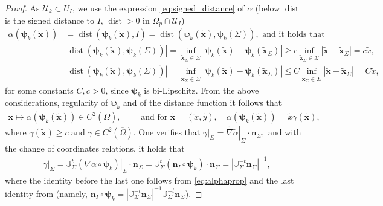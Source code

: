 \documentclass[report]{elsarticle}
\newtheorem{lemma}[theorem]{Lemma}
\numberwithin{theorem}{section}
\newcommand{\tbx}{\widetilde{\mathbf{x}}}
\newcommand{\bpsi}{\boldsymbol{\psi}}
\renewcommand{\vec}[1]{\mathbf{#1}}
\begin{document}
\begin{proof}
As $\mathcal{U}_k\subset U_I$, we use the expression  \eqref{eq:signed_distance} of $\alpha$ (below $\operatorname{dist}$ is the signed distance to $I$, $\operatorname{dist}>0$ in $\Omega_p\cap \mathcal{U}_I$)
	\begin{align*}
		\alpha(\bpsi_k(\tbx))&=\operatorname{dist}(\bpsi_k(\tbx), I)=\operatorname{dist}(\bpsi_k(\tbx), \bpsi_k(\Sigma)), \text{ and it holds that }\\	
		&|\operatorname{dist}(\bpsi_k(\tbx), \bpsi_k(\Sigma))|=\inf_{\tbx_{\Sigma}\in \Sigma}|\bpsi_k(\tbx)-\bpsi_k(\tbx_{\Sigma})|\geq c\inf_{\tbx_{\Sigma}\in \Sigma}|\tbx-\tbx_{\Sigma}|=c\tilde{x},\\ 
		&|\operatorname{dist}(\bpsi_k(\tbx), \bpsi_k(\Sigma))|=\inf_{\tbx_{\Sigma}\in \Sigma}|\bpsi_k(\tbx)-\bpsi_k(\tbx_{\Sigma})|\leq C\inf_{\tbx_{\Sigma}\in \Sigma}|\tbx-\tbx_{\Sigma}|=C\tilde{x},
	\end{align*}
	for some constants $C, c>0$, since $\bpsi_k$ is bi-Lipschitz. From the above considerations,  regularity of $\bpsi_k$ and of the distance function it follows that 
	\begin{align*}
		\tbx\mapsto \alpha(\bpsi_k(\tbx))\in C^2(\overline{\Omega}),\qquad 
		\text{ and for }\tbx=(\tilde{x},\tilde{y}),\quad \alpha(\bpsi_k(\tbx))=\tilde{x}\gamma(\tbx),	
	\end{align*}
	where $\gamma(\tbx)\geq c$ and $\gamma\in C^{2}(\overline{\Omega})$. One verifies that $ \left.\gamma\right|_{\Sigma}=\left.\widetilde{\nabla}\widetilde{\alpha}\right|_{\Sigma}\cdot \vec{n}_{\Sigma},$
and with the change of coordinates relations, it holds that 
\begin{align*}
	\left.\gamma\right|_{\Sigma}=\mathbb{J}^t_{\Sigma}\left.(\nabla \alpha\circ\bpsi_k)\right|_{\Sigma} \cdot\vec{n}_{\Sigma}=\mathbb{J}^t_{\Sigma}(\vec{n}_I\circ \bpsi_k)\cdot\vec{n}_{\Sigma}=|\mathbb{J}^{-t}_{\Sigma}\vec{n}_{\Sigma}|^{-1}, %
\end{align*}
where the identity before the last one follows from \eqref{eq:alphaprop} and the last identity from \cite[(2.1.94)]{boffi} (namely, $\vec{n}_I\circ \vec{\psi}_k=|\mathbb{J}^{-t}_{\Sigma}\vec{n}_{\Sigma}|^{-1}\mathbb{J}^{-t}_{\Sigma}\vec{n}_{\Sigma}$).
\end{proof}
\end{document}

